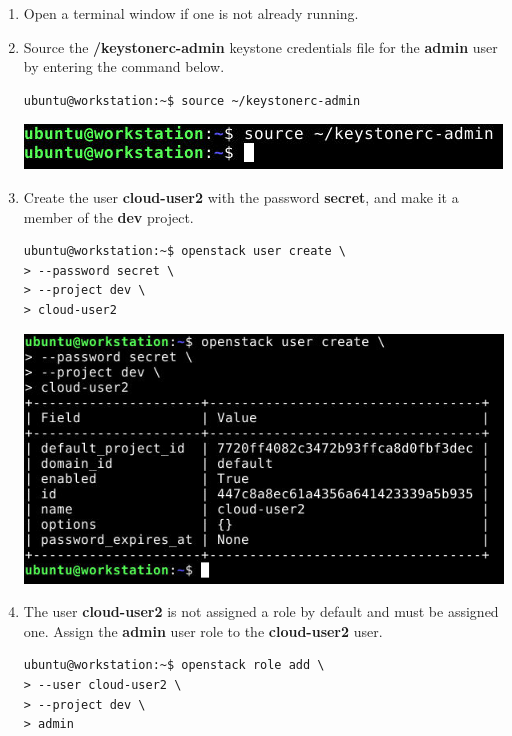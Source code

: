 \documentclass[letterpaper, 12pt]{article}
\begin{document}
\begin{enumerate}
    \item Open a terminal window if one is not already running.
    
    \item Source the \textbf{\texttildemid/keystonerc-admin} keystone credentials file for the
    \textbf{admin} user by entering the command below.
\begin{lstlisting}
ubuntu@workstation:~$ source ~/keystonerc-admin
\end{lstlisting}

    \begin{center}
        \includegraphics[width=\linewidth]{images/part6/step2.png}
    \end{center}

    \item Create the user \textbf{cloud-user2} with the password \textbf{secret}, and make it a member of the
    \textbf{dev} project.
\begin{lstlisting}
ubuntu@workstation:~$ openstack user create \
> --password secret \
> --project dev \
> cloud-user2
\end{lstlisting}

    \begin{center}
        \includegraphics[width=\linewidth]{images/part6/step3.png}
    \end{center}

    \item The user \textbf{cloud-user2} is not assigned a role by default and must be assigned one. Assign the
    \textbf{admin} user role to the \textbf{cloud-user2} user.
\begin{lstlisting}
ubuntu@workstation:~$ openstack role add \
> --user cloud-user2 \
> --project dev \
> admin
\end{lstlisting}


\end{enumerate}
\end{document}
